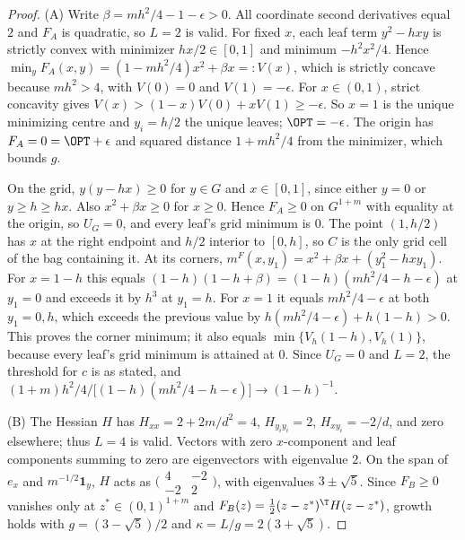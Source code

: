 \begin{proof}
(A) Write $\beta=mh^2/4-1-\epsilon>0$. All coordinate second derivatives
equal $2$ and $F_A$ is quadratic, so $L=2$ is valid. For fixed $x$, each
leaf term $y^2-hxy$ is strictly convex with minimizer $hx/2\in[0,1]$ and
minimum $-h^2x^2/4$. Hence $\min_yF_A(x,y)=(1-mh^2/4)x^2+\beta x=:V(x)$,
which is strictly concave because $mh^2>4$, with $V(0)=0$ and
$V(1)=-\epsilon$. For $x\in(0,1)$, strict concavity gives
$V(x)>(1-x)V(0)+xV(1)\ge-\epsilon$. So $x=1$ is the unique minimizing
centre and $y_i=h/2$ the unique leaves; $\OPT=-\epsilon$. The origin has
$F_A=0=\OPT+\epsilon$ and squared distance $1+mh^2/4$ from the minimizer,
which bounds $g$.

On the grid, $y(y-hx)\ge0$ for $y\in G$ and $x\in[0,1]$, since either
$y=0$ or $y\ge h\ge hx$. Also $x^2+\beta x\ge0$ for $x\ge0$. Hence
$F_A\ge0$ on $G^{1+m}$ with equality at the origin, so $U_G=0$, and every
leaf's grid minimum is $0$. The point $(1,h/2)$ has $x$ at the right
endpoint and $h/2$ interior to $[0,h]$, so $C$ is the only grid cell of
the bag containing it. At its corners,
$m^F(x,y_1)=x^2+\beta x+(y_1^2-hxy_1)$. For $x=1-h$ this equals
$(1-h)(1-h+\beta)=(1-h)(mh^2/4-h-\epsilon)$ at $y_1=0$ and exceeds it by
$h^3$ at $y_1=h$. For $x=1$ it equals $mh^2/4-\epsilon$ at both $y_1=0,h$,
which exceeds the previous value by $h(mh^2/4-\epsilon)+h(1-h)>0$. This
proves the corner minimum; it also equals $\min\{V_h(1-h),V_h(1)\}$,
because every leaf's grid minimum is attained at $0$. Since $U_G=0$ and
$L=2$, the threshold for $c$ is as stated, and
$(1+m)h^2/4\big/\bigl[(1-h)(mh^2/4-h-\epsilon)\bigr]\to(1-h)^{-1}$.

(B) The Hessian $H$ has $H_{xx}=2+2m/d^2=4$, $H_{y_iy_i}=2$,
$H_{xy_i}=-2/d$, and zero elsewhere; thus $L=4$ is valid. Vectors with
zero $x$-component and leaf components summing to zero are eigenvectors
with eigenvalue $2$. On the span of $e_x$ and $m^{-1/2}\mathbf 1_y$, $H$
acts as $\bigl(\begin{smallmatrix}4&-2\\-2&2\end{smallmatrix}\bigr)$, with
eigenvalues $3\pm\sqrt5$. Since $F_B\ge0$ vanishes only at $z^*\in(0,1)^{1+m}$
and $F_B(z)=\frac12(z-z^*)^{\T}H(z-z^*)$, growth holds with
$g=(3-\sqrt5)/2$ and $\kappa=L/g=2(3+\sqrt5)$.


\end{proof}
